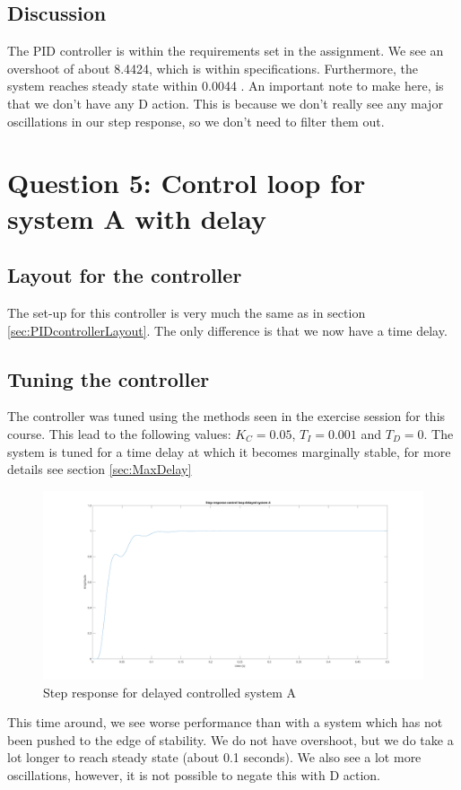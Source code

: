 \documentclass[a4paper,kul]{kulakarticle} %
\begin{document}
		\newpage
		\subsection{Discussion}
			The PID controller is within the requirements set in the assignment. We see an overshoot of about 8.4424, which is within specifications. Furthermore, the system reaches steady state within 0.0044 . An important note to make here, is that we don't have any D action. This is because we don't really see any major oscillations in our step response, so we don't need to filter them out.
	\newpage	
	\section{Question 5: Control loop for system A with delay}
		\subsection{Layout for the controller}
			The set-up for this controller is very much the same as in section \ref{sec:PIDcontrollerLayout}. The only difference is that we now have a time delay. 
			
			
		\subsection{Tuning the controller}
			The controller was tuned using the methods seen in the exercise session for this course. This lead to the following values: $K_C = 0.05$, $T_I = 0.001$ and $T_D = 0$. The system is tuned for a time delay at which it becomes marginally stable, for more details see section \ref{sec:MaxDelay} \\
			
			\begin{figure}[h]
				\centering
				\includegraphics[width=0.7\linewidth]{stepDelayedControlledSystemA}
				\caption[Step delayed controlled system A]{Step response for delayed controlled system A}
				\label{fig:stepDelayedControlledSystemA}
			\end{figure}
			This time around, we see worse performance than with a system which has not been pushed to the edge of stability. We do not have overshoot, but we do take a lot longer to reach steady state (about 0.1 seconds). We also see a lot more oscillations, however, it is not possible to negate this with D action. 
\end{document}

